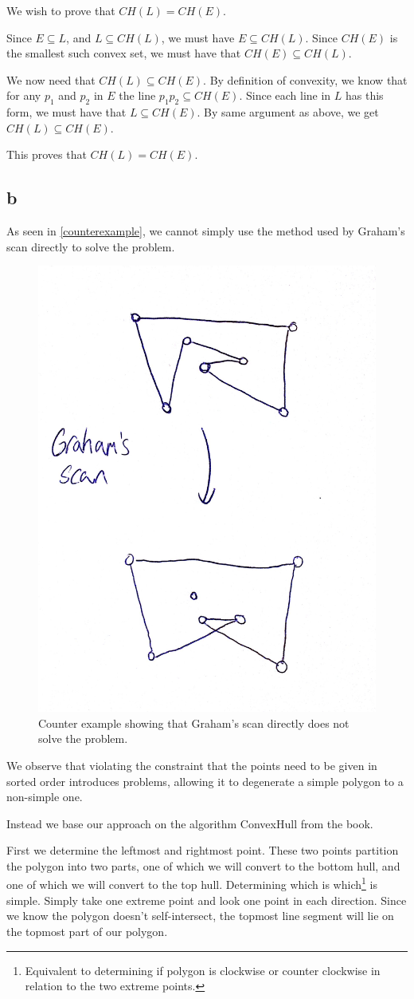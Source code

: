\documentclass[11pt,a4paper]{article}
\begin{document}
We wish to prove that $CH(L) = CH(E)$.

Since $E \subseteq L$, and $L \subseteq CH(L)$, we must have $E \subseteq CH(L)$. Since
$CH(E)$ is the smallest such convex set, we must have that $CH(E) \subseteq CH(L)$.

We now need that $CH(L) \subseteq CH(E)$. By definition of convexity, we know that for any
$p_1$ and $p_2$ in $E$ the line $p_1p_2 \subseteq CH(E)$. Since each line in $L$ has this
form, we must have that $L \subseteq CH(E)$. By same argument as above, we get $CH(L) \subseteq CH(E)$.

This proves that $CH(L) = CH(E)$.

\subsection{b}

As seen in \autoref{counterexample}, we cannot simply use the method used by
Graham's scan directly to solve the problem.

\begin{figure}[h!]
    \centering
    \includegraphics[width=.5\textwidth]{counterexample.jpg}
\caption{Counter example showing that Graham's scan directly does not solve the problem.}
\label{counterexample}
\end{figure}

We observe that violating the constraint that the points need to be given in sorted order
introduces problems, allowing it to degenerate a simple polygon to a non-simple one.

Instead we base our approach on the algorithm ConvexHull from the book. 

First we determine the leftmost and rightmost point. These two points partition the polygon into two parts, one of which we will convert to the bottom hull, and one of which we will convert to the top hull. Determining which is which\footnote{Equivalent to determining if polygon is clockwise or counter clockwise in relation to the two extreme points.} is simple. Simply take one extreme point and look one point in each direction. Since we know the polygon doesn't self-intersect, the topmost line segment will lie on the topmost part of our polygon.
\end{document}
